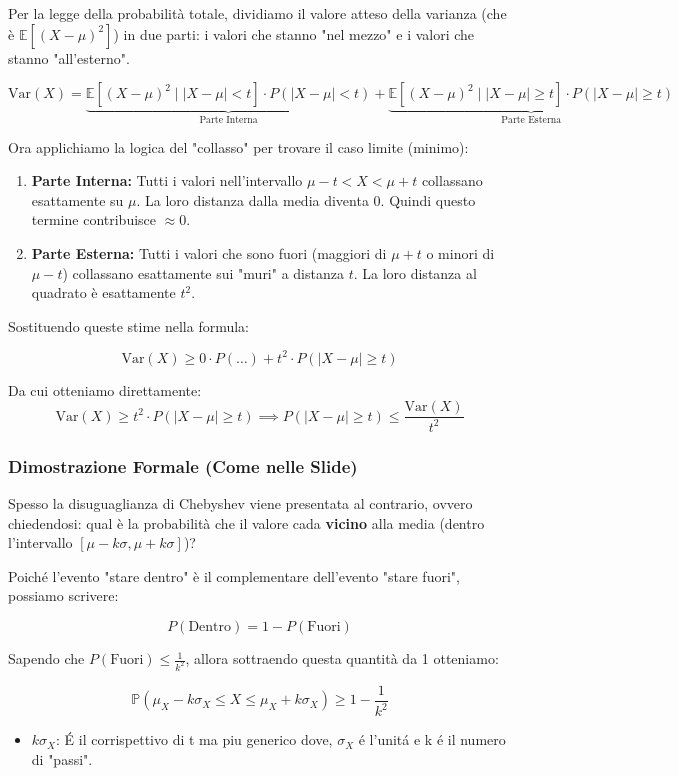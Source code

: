 Per la legge della probabilità totale, dividiamo il valore atteso della varianza (che è $\mathbb{E}[(X-\mu)^2]$) in due parti: i valori che stanno "nel mezzo" e i valori che stanno "all'esterno".

\[
\text{Var}(X) = \underbrace{\mathbb{E}[(X-\mu)^2 \mid |X-\mu| < t] \cdot P(|X-\mu| < t)}_{\text{Parte Interna}} + \underbrace{\mathbb{E}[(X-\mu)^2 \mid |X-\mu| \ge t] \cdot P(|X-\mu| \ge t)}_{\text{Parte Esterna}}
\]

Ora applichiamo la logica del "collasso" per trovare il caso limite (minimo):
\begin{enumerate}
    \item \textbf{Parte Interna:} Tutti i valori nell'intervallo $\mu-t < X < \mu+t$ collassano esattamente su $\mu$.
    La loro distanza dalla media diventa $0$. Quindi questo termine contribuisce $\approx 0$.
    
    \item \textbf{Parte Esterna:} Tutti i valori che sono fuori (maggiori di $\mu+t$ o minori di $\mu-t$) collassano esattamente sui "muri" a distanza $t$.
    La loro distanza al quadrato è esattamente $t^2$.
\end{enumerate}

Sostituendo queste stime nella formula:

\[
\text{Var}(X) \ge 0 \cdot P(\dots) + t^2 \cdot P(|X-\mu| \ge t)
\]

Da cui otteniamo direttamente:
\[
\text{Var}(X) \ge t^2 \cdot P(|X-\mu| \ge t) \implies P(|X-\mu| \ge t) \le \frac{\text{Var}(X)}{t^2}
\]

\subsubsection{Dimostrazione Formale (Come nelle Slide)}
Spesso la disuguaglianza di Chebyshev viene presentata al contrario, ovvero chiedendosi: qual è la probabilità che il valore cada \textbf{vicino} alla media (dentro l'intervallo $[\mu - k\sigma, \mu + k\sigma]$)?

Poiché l'evento "stare dentro" è il complementare dell'evento "stare fuori", possiamo scrivere:

\[
P(\text{Dentro}) = 1 - P(\text{Fuori})
\]

Sapendo che $P(\text{Fuori}) \le \frac{1}{k^2}$, allora sottraendo questa quantità da 1 otteniamo:

\begin{equation}
\boxed{\mathbb{P}(\mu_X - k\sigma_X \le X \le \mu_X + k\sigma_X) \ge 1 - \frac{1}{k^2}}
\end{equation}
\begin{itemize}
    \item $k\sigma_X$: É il corrispettivo di t ma piu generico dove, $\sigma_X$ é l'unitá e k é il numero di "passi".
\end{itemize}



